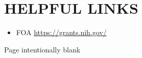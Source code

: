 \documentclass[11pt]{article}
\newcommand{\Red}[1]{{\color{red} #1}\xspace}
\begin{document}
\newpage
\section*{\Red{HELPFUL LINKS}}

\begin{itemize}
  \item FOA \url{https://grants.nih.gov/}
\end{itemize}

\newpage
Page intentionally blank

% 

\newpage


\newpage
% 

% 

\newpage


\newpage


\newpage


\newpage


\newpage



\newpage


\newpage


\newpage


\newpage


\newpage


\newpage
\normalem
\printbibliography[title={References Cited}]
\ULforem

\end{document}
